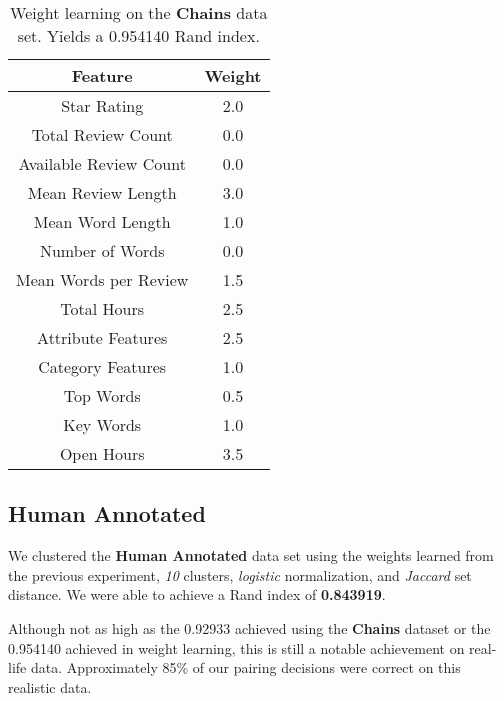 \documentclass{article}
\begin{document}
      \begin{table}
         \begin{center}
            \begin{tabular}{| c | c |}
               \hline
                  Feature & Weight \\
               \hline
                  Star Rating & 2.0 \\
                  Total Review Count & 0.0 \\
                  Available Review Count & 0.0 \\
                  Mean Review Length & 3.0 \\
                  Mean Word Length & 1.0 \\
                  Number of Words & 0.0 \\
                  Mean Words per Review & 1.5 \\
                  Total Hours & 2.5 \\
                  Attribute Features & 2.5 \\
                  Category Features & 1.0 \\
                  Top Words & 0.5 \\
                  Key Words & 1.0 \\
                  Open Hours & 3.5 \\
               \hline
            \end{tabular}
            \caption{Weight learning on the \textbf{Chains} data set. Yields a 0.954140 Rand index.}
            \label{tab:weight-learning}
         \end{center}
      \end{table}

   \subsection{Human Annotated}
      We clustered the \textbf{Human Annotated} data set using the weights learned from the previous experiment, \textit{10} clusters, \textit{logistic} normalization, and \textit{Jaccard} set distance.
      We were able to achieve a Rand index of \textbf{0.843919}.

      Although not as high as the 0.92933 achieved using the \textbf{Chains} dataset or the 0.954140 achieved in weight learning, this is still a notable achievement on real-life data.
      Approximately 85\% of our pairing decisions were correct on this realistic data.
\end{document}
